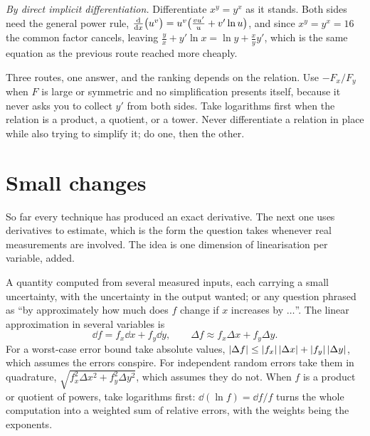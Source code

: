 \emph{By direct implicit differentiation.} Differentiate $x^{y}=y^{x}$ as it stands. Both sides need the general power rule, $\frac{\mathrm{d}}{\mathrm{d}x}\bigl(u^{v}\bigr)=u^{v}\bigl(\tfrac{v u'}{u}+v'\ln u\bigr)$, and since $x^{y}=y^{x}=16$ the common factor cancels, leaving $\tfrac{y}{x}+y'\ln x=\ln y+\tfrac{x}{y}y'$, which is the same equation as the previous route reached more cheaply.

Three routes, one answer, and the ranking depends on the relation. Use $-F_{x}/F_{y}$ when $F$ is large or symmetric and no simplification presents itself, because it never asks you to collect $y'$ from both sides. Take logarithms first when the relation is a product, a quotient, or a tower. Never differentiate a relation in place while also trying to simplify it; do one, then the other.

\section{Small changes}

So far every technique has produced an exact derivative. The next one uses derivatives to estimate, which is the form the question takes whenever real measurements are involved. The idea is one dimension of linearisation per variable, added.

\cue A quantity computed from several measured inputs, each carrying a small uncertainty, with the uncertainty in the output wanted; or any question phrased as ``by approximately how much does $f$ change if $x$ increases by $\ldots$''.
\method The linear approximation in several variables is
\[
\dd f=f_{x}\dd x+f_{y}\dd y,\qquad \Delta f\approx f_{x}\Delta x+f_{y}\Delta y .
\]
For a worst-case error bound take absolute values, $\left\lvert \Delta f\right\rvert\leq\left\lvert f_{x}\right\rvert\left\lvert \Delta x\right\rvert+\left\lvert f_{y}\right\rvert\left\lvert \Delta y\right\rvert$, which assumes the errors conspire. For independent random errors take them in quadrature, $\sqrt{f_{x}^{2}\Delta x^{2}+f_{y}^{2}\Delta y^{2}}$, which assumes they do not. When $f$ is a product or quotient of powers, take logarithms first: $\dd(\ln f)=\dd f/f$ turns the whole computation into a weighted sum of relative errors, with the weights being the exponents.


